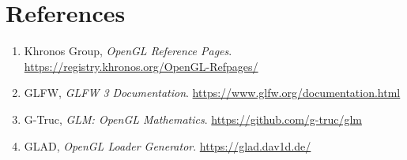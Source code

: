 \documentclass{article}
\begin{document}
\section{References}
\begin{enumerate}
    \item Khronos Group, \textit{OpenGL Reference Pages}. \url{https://registry.khronos.org/OpenGL-Refpages/}
    \item GLFW, \textit{GLFW 3 Documentation}. \url{https://www.glfw.org/documentation.html}
    \item G-Truc, \textit{GLM: OpenGL Mathematics}. \url{https://github.com/g-truc/glm}
    \item GLAD, \textit{OpenGL Loader Generator}. \url{https://glad.dav1d.de/}
\end{enumerate}
\end{document}
